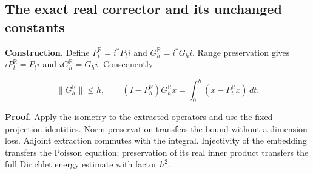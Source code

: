 \documentclass[11pt,a4paper]{report}
\begin{document}
\subsection{\texorpdfstring{The exact real corrector and its unchanged constants}{The exact real corrector and its unchanged constants}}
\label{report-step-WassersteinMixing-ComplexRealCorrector-lean-3}


\textbf{Construction.} Define \(P_t^{\mathbb R}=i^*P_ti\) and \(G_h^{\mathbb R}=i^*G_hi\). Range preservation gives \(iP_t^{\mathbb R}=P_ti\) and \(iG_h^{\mathbb R}=G_hi\). Consequently

\[\|G_h^{\mathbb R}\|\le h,\qquad (I-P_h^{\mathbb R})G_h^{\mathbb R}x=\int_0^h(x-P_t^{\mathbb R}x)\,dt.\]

\textbf{Proof.} Apply the isometry to the extracted operators and use the fixed projection identities. Norm preservation transfers the bound without a dimension loss. Adjoint extraction commutes with the integral. Injectivity of the embedding transfers the Poisson equation; preservation of its real inner product transfers the full Dirichlet energy estimate with factor \(h^2\).
\end{document}
